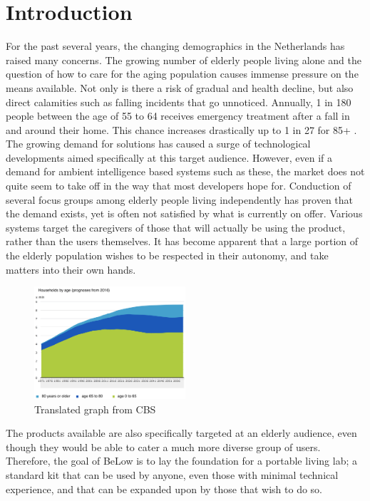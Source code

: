 \documentclass{below-ext}
\begin{document}
\section{Introduction}
For the past several years, the changing demographics in the Netherlands has raised many concerns. The growing number of elderly people living alone and the question of how to care for the aging population causes immense pressure on the means available. Not only is there a risk of gradual and health decline, but also direct calamities such as falling incidents that go unnoticed. Annually, 1 in 180 people between the age of 55 to 64 receives emergency treatment after a fall in and around their home. This chance increases drastically up to 1 in 27 for 85+ \cite{seh}.  The growing demand for solutions has caused a  surge of technological developments aimed specifically at this target audience. However, even if a demand for ambient intelligence based systems such as these, the market does not quite seem to take off in the way that most developers hope for. Conduction of several focus groups among elderly people living independently has proven that the demand exists, yet is often not satisfied by what is currently on offer. Various systems target the caregivers of those that will actually be using the product, rather than the users themselves. It has become apparent that a large portion of the elderly population wishes to be respected in their autonomy, and take matters into their own hands.\cite{cbs_households}


\begin{figure}
\centering
\includegraphics[width=0.5\textwidth]{cbs_household_age_report}
\caption[Translated graph]{Translated graph from CBS\footnotemark }
\label{fig:cbs}
\end{figure}
The products available are also specifically targeted at an elderly audience, even though they would be able to cater a much more diverse group of users. Therefore, the goal of BeLow is to lay the foundation for a portable living lab; a standard kit that can be used by anyone, even those with minimal technical experience, and that can be expanded upon by those that wish to do so.
\end{document}
